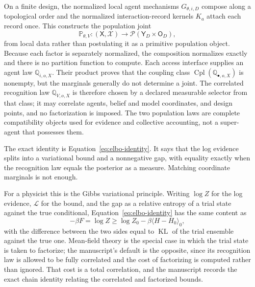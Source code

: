 \documentclass[11pt,letterpaper]{article}
\newcommand{\KL}{\operatorname{KL}}
\newcommand{\Law}{\mathcal P}
\begin{document}
On a finite design, the normalized local agent mechanisms \(G_{\theta,i,D}\) compose along a topological order and the normalized interaction-record kernels \(K_a\) attach each record once. This constructs the population joint
\begin{equation}
  \mathbb P_{\theta,V}:(\mathsf X,\mathscr X)\longrightarrow\Law(\mathsf Y_D\times\mathsf O_D),
  \label{eq:generative-signature}
\end{equation}
from local data rather than postulating it as a primitive population object. Because each factor is separately normalized, the composition normalizes exactly and there is no partition function to compute. Each access interface supplies an agent law \(\mathbb Q_{i,o,X}\). Their product proves that the coupling class \(\operatorname{Cpl}(\mathbb Q_{\bullet,o,X})\) is nonempty, but the marginals generally do not determine a joint. The correlated recognition law \(\mathbb Q_{V,o,X}\) is therefore chosen by a declared measurable selector from that class; it may correlate agents, belief and model coordinates, and design points, and no factorization is imposed. The two population laws are complete compatibility objects used for evidence and collective accounting, not a super-agent that possesses them.

The exact identity is Equation~\eqref{eq:elbo-identity}. It says that the log evidence splits into a variational bound and a nonnegative gap, with equality exactly when the recognition law equals the posterior as a measure. Matching coordinate marginals is not enough.

For a physicist this is the Gibbs variational principle. Writing \(\log Z\) for the log evidence, \(\mathcal L\) for the bound, and the gap as a relative entropy of a trial state against the true conditional, Equation~\eqref{eq:elbo-identity} has the same content as
\begin{equation}
  -\beta F=\log Z\geq \log Z_0-\beta\langle H-H_0\rangle_0,
  \label{eq:gbf}
\end{equation}
with the difference between the two sides equal to \(\KL\) of the trial ensemble against the true one. Mean-field theory is the special case in which the trial state is taken to factorize; the manuscript's default is the opposite, since its recognition law is allowed to be fully correlated and the cost of factorizing is computed rather than ignored. That cost is a total correlation, and the manuscript records the exact chain identity relating the correlated and factorized bounds.
\end{document}
